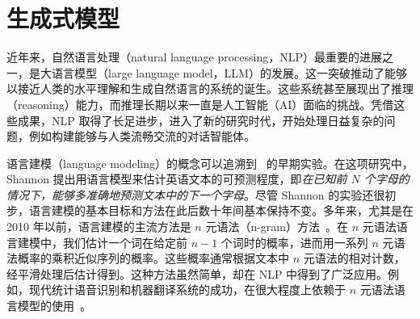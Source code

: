 
%




\chapter{生成式模型}

\thispagestyle{chapterurl} %

\noindent 近年来，自然语言处理（natural language processing，NLP）最重要的进展之一，是大语言模型（large language model，LLM）的发展。这一突破推动了能够以接近人类的水平理解和生成自然语言的系统的诞生。这些系统甚至展现出了推理（reasoning）能力，而推理长期以来一直是人工智能（AI）面临的挑战。凭借这些成果，NLP 取得了长足进步，进入了新的研究时代，开始处理日益复杂的问题，例如构建能够与人类流畅交流的对话智能体。

语言建模（language modeling）的概念可以追溯到~\citet{shannon:1951prediction} 的早期实验。在这项研究中，Shannon 提出用语言模型来估计英语文本的可预测程度，即\textit{在已知前 $N$ 个字母的情况下，能够多准确地预测文本中的下一个字母}。尽管 Shannon 的实验还很初步，语言建模的基本目标和方法在此后数十年间基本保持不变。多年来，尤其是在 2010 年以前，语言建模的主流方法是 $n$ 元语法（n-gram）方法~\cite{Jurafsky-and-Martin:2008}。在 $n$ 元语法语言建模中，我们估计一个词在给定前 $n-1$ 个词时的概率，进而用一系列 $n$ 元语法概率的乘积近似序列的概率。这些概率通常根据文本中 $n$ 元语法的相对计数，经平滑处理后估计得到。这种方法虽然简单，却在 NLP 中得到了广泛应用。例如，现代统计语音识别和机器翻译系统的成功，在很大程度上依赖于 $n$ 元语法语言模型的使用~\cite{jelinek:1998statistical,Koehn:2010}。

